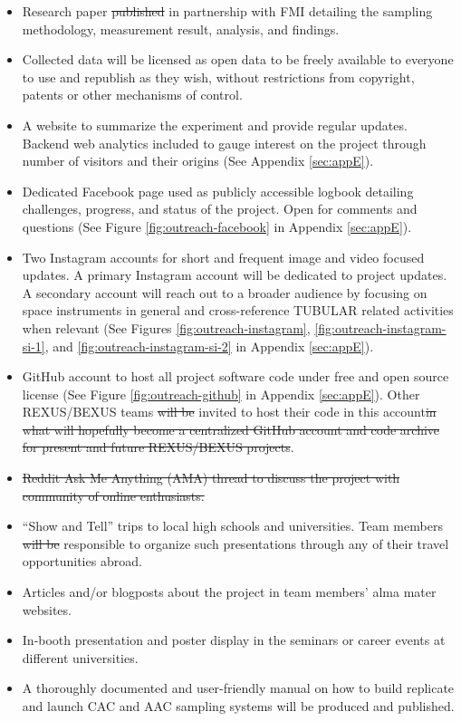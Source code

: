 \documentclass[a4paper,12pt,oneside]{article}
\providecommand{\DIFaddtex}[1]{{\protect\color{blue}\uwave{#1}}} %
\providecommand{\DIFdeltex}[1]{{\protect\color{red}\sout{#1}}}                      %
\providecommand{\DIFaddbegin}{} %
\providecommand{\DIFaddend}{} %
\providecommand{\DIFdelbegin}{} %
\providecommand{\DIFdelend}{} %
\providecommand{\DIFadd}[1]{\texorpdfstring{\DIFaddtex{#1}}{#1}} %
\providecommand{\DIFdel}[1]{\texorpdfstring{\DIFdeltex{#1}}{}} %
\newcommand{\DIFscaledelfig}{0.5}
\newlength{\DIFdelgraphicswidth} %
\newlength{\DIFdelgraphicsheight} %
\newcommand{\DIFaddincludegraphics}[2][]{{\color{blue}\fbox{\DIFOincludegraphics[#1]{#2}}}} %
\newcommand{\DIFdelincludegraphics}[2][]{%
\sbox{\DIFdelgraphicsbox}{\DIFOincludegraphics[#1]{#2}}%
\settoboxwidth{\DIFdelgraphicswidth}{\DIFdelgraphicsbox} %
\settoboxtotalheight{\DIFdelgraphicsheight}{\DIFdelgraphicsbox} %
\scalebox{\DIFscaledelfig}{%
\parbox[b]{\DIFdelgraphicswidth}{\usebox{\DIFdelgraphicsbox}\\[-\baselineskip] \rule{\DIFdelgraphicswidth}{0em}}\llap{\resizebox{\DIFdelgraphicswidth}{\DIFdelgraphicsheight}{%
\setlength{\unitlength}{\DIFdelgraphicswidth}%
\begin{picture}(1,1)%
\thicklines\linethickness{2pt} %
{\color[rgb]{1,0,0}\put(0,0){\framebox(1,1){}}}%
{\color[rgb]{1,0,0}\put(0,0){\line( 1,1){1}}}%
{\color[rgb]{1,0,0}\put(0,1){\line(1,-1){1}}}%
\end{picture}%
}\hspace*{3pt}}} %
} %
\DeclareRobustCommand{\DIFaddbegin}{\DIFOaddbegin \let\includegraphics\DIFaddincludegraphics} %
\DeclareRobustCommand{\DIFaddend}{\DIFOaddend \let\includegraphics\DIFOincludegraphics} %
\DeclareRobustCommand{\DIFdelbegin}{\DIFOdelbegin \let\includegraphics\DIFdelincludegraphics} %
\DeclareRobustCommand{\DIFdelend}{\DIFOaddend \let\includegraphics\DIFOincludegraphics} %
\begin{document}
\begin{itemize}
\item Research paper \DIFdelbegin \DIFdel{published }\DIFdelend \DIFaddbegin \DIFadd{publication work }\DIFaddend in partnership with FMI detailing the sampling methodology, measurement result, analysis, and findings.
\item Collected data will be licensed as open data to be freely available to everyone to use and republish as they wish, without restrictions from copyright, patents or other mechanisms of control.
\item A website to summarize the experiment and provide regular updates. Backend web analytics included to gauge interest on the project through number of visitors and their origins (See Appendix \ref{sec:appE}).
\item Dedicated Facebook page used as publicly accessible logbook detailing challenges, progress, and status of the project. Open for comments and questions (See Figure \ref{fig:outreach-facebook} in Appendix \ref{sec:appE}).
\item Two Instagram accounts for short and frequent image and video focused updates. A primary Instagram account will be dedicated to project updates. A secondary account will reach out to a broader audience by focusing on space instruments in general and cross-reference TUBULAR related activities when relevant (See Figures \ref{fig:outreach-instagram}, \ref{fig:outreach-instagram-si-1}, and \ref{fig:outreach-instagram-si-2} in Appendix \ref{sec:appE}).
\item GitHub account to host all project software code under free and open source license (See Figure \ref{fig:outreach-github} in Appendix \ref{sec:appE}). Other REXUS/BEXUS teams \DIFdelbegin \DIFdel{will be }\DIFdelend \DIFaddbegin \DIFadd{were }\DIFaddend invited to host their code in this account\DIFdelbegin \DIFdel{in what will hopefully become a centralized GitHub account and code archive for present and future REXUS/BEXUS projects}\DIFdelend .
\item\DIFdelbegin \DIFdel{Reddit Ask Me Anything (AMA) thread to discuss the project with community of online enthusiasts.
}%
\item%
\DIFdelend \enquote{Show and Tell} trips to local high schools and universities. Team members \DIFdelbegin \DIFdel{will be }\DIFdelend \DIFaddbegin \DIFadd{were }\DIFaddend responsible to organize such presentations through any of their travel opportunities abroad.
\item Articles and/or blogposts about the project in team members' alma mater websites.
\item In-booth presentation and poster display in the seminars or career events at different universities. 
\item A thoroughly documented and user-friendly manual on how to build replicate and launch CAC and AAC sampling systems will be produced and published.
\end{itemize}
\pagebreak
\end{document}
